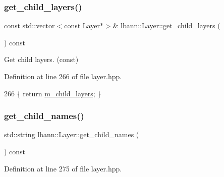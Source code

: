 \subsubsection{\texorpdfstring{get\+\_\+child\+\_\+layers()}{get\_child\_layers()}\hspace{0.1cm}{\footnotesize\ttfamily [2/2]}}
{\footnotesize\ttfamily const std\+::vector$<$const \hyperlink{classlbann_1_1Layer}{Layer}$\ast$$>$\& lbann\+::\+Layer\+::get\+\_\+child\+\_\+layers (\begin{DoxyParamCaption}{ }\end{DoxyParamCaption}) const\hspace{0.3cm}{\ttfamily [inline]}}

Get child layers. (const) 

Definition at line 266 of file layer.\+hpp.


\begin{DoxyCode}
266 \{ \textcolor{keywordflow}{return} \hyperlink{classlbann_1_1Layer_ae348c0d2b4d05f74d809d09debb633c0}{m\_child\_layers}; \}
\end{DoxyCode}
\mbox{\label{classlbann_1_1Layer_afc7bf4e2a61a6f47f9e1f185bf92439a}} 
\subsubsection{\texorpdfstring{get\+\_\+child\+\_\+names()}{get\_child\_names()}}
{\footnotesize\ttfamily std\+::string lbann\+::\+Layer\+::get\+\_\+child\+\_\+names (\begin{DoxyParamCaption}{ }\end{DoxyParamCaption}) const\hspace{0.3cm}{\ttfamily [inline]}}



Definition at line 275 of file layer.\+hpp.


